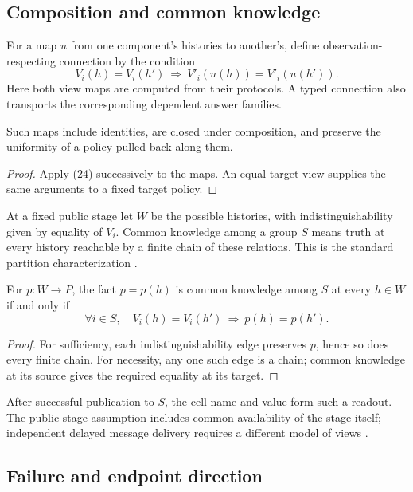 \subsection{Composition and common knowledge}

For a map $u$ from one component's histories to another's, define
observation-respecting connection by the condition
\[
 V_i(h)=V_i(h')\ \Longrightarrow\
 V'_i(u(h))=V'_i(u(h')).
 \tag{24}
\]
Here both view maps are computed from their protocols. A typed connection
also transports the corresponding dependent answer families.

\begin{lemma}
\label{lem:view-composition}
Such maps include identities, are closed under composition, and preserve
the uniformity of a policy pulled back along them.
\end{lemma}
\begin{proof}
Apply (24) successively to the maps. An equal target view supplies the same
arguments to a fixed target policy.
\end{proof}

At a fixed public stage let $W$ be the possible histories, with
indistinguishability given by equality of $V_i$. Common knowledge among a
group $S$ means truth at every history reachable by a finite chain of these
relations. This is the standard partition characterization
\cite{Aumann1976,HalpernMoses1990}.

\begin{lemma}
\label{thm:common-knowledge}
For $p:W\to P$, the fact $p=p(h)$ is common knowledge among $S$ at every
$h\in W$ if and only if
\[
 \forall i\in S,\quad
 V_i(h)=V_i(h')\ \Longrightarrow\ p(h)=p(h').
 \tag{25}
\]
\end{lemma}
\begin{proof}
For sufficiency, each indistinguishability edge preserves $p$, hence so
does every finite chain. For necessity, any one such edge is a chain;
common knowledge at its source gives the required equality at its target.
\end{proof}

After successful publication to $S$, the cell name and value form such a
readout. The public-stage assumption includes common availability of the
stage itself; independent delayed message delivery requires a different
model of views \cite{HalpernMoses1990,BaltagMossSolecki1999}.

\subsection{Failure and endpoint direction}

